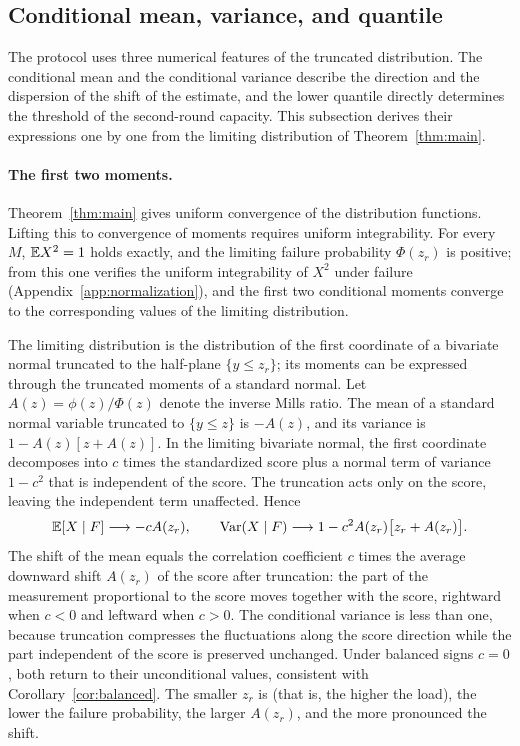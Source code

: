 \subsection{Conditional mean, variance, and quantile}\label{sec:mean}
The protocol uses three numerical features of the truncated distribution. The conditional mean and the conditional variance
describe the direction and the dispersion of the shift of the estimate, and the lower quantile directly determines the threshold of
the second-round capacity. This subsection derives their expressions one by one from the limiting distribution of
Theorem~\ref{thm:main}.

\paragraph{The first two moments.}
Theorem~\ref{thm:main} gives uniform convergence of the distribution functions. Lifting this to convergence of moments requires
uniform integrability. For every $M$, $\mathbb E X^2=1$ holds exactly, and the limiting failure probability $\Phi(z_r)$ is positive; from
this one verifies the uniform integrability of $X^2$ under failure (Appendix~\ref{app:normalization}), and the first two conditional
moments converge to the corresponding values of the limiting distribution.

The limiting distribution is the distribution of the first coordinate of a bivariate normal truncated to the half-plane
$\{y\le z_r\}$; its moments can be expressed through the truncated moments of a standard normal. Let $A(z)=\phi(z)/\Phi(z)$ denote
the inverse Mills ratio. The mean of a standard normal variable truncated to $\{y\le z\}$ is $-A(z)$, and its variance is
$1-A(z)[z+A(z)]$. In the limiting bivariate normal, the first coordinate decomposes into $c$ times the standardized score plus a
normal term of variance $1-c^2$ that is independent of the score. The truncation acts only on the score, leaving the independent
term unaffected. Hence
\begin{equation*}
\mathbb E[X\mid F]\longrightarrow-cA(z_r),\qquad
\operatorname{Var}(X\mid F)\longrightarrow1-c^2A(z_r)\bigl[z_r+A(z_r)\bigr].
\end{equation*}
The shift of the mean equals the correlation coefficient $c$ times the average downward shift $A(z_r)$ of the score after
truncation: the part of the measurement proportional to the score moves together with the score, rightward when $c<0$ and leftward
when $c>0$. The conditional variance is less than one, because truncation compresses the fluctuations along the score direction
while the part independent of the score is preserved unchanged. Under balanced signs $c=0$, both return to their unconditional
values, consistent with Corollary~\ref{cor:balanced}. The smaller $z_r$ is (that is, the higher the load), the lower the failure
probability, the larger $A(z_r)$, and the more pronounced the shift.

